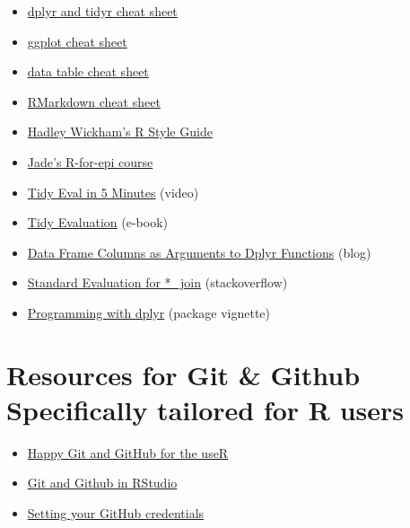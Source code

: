\documentclass[
]{book}
\providecommand{\tightlist}{%
  \setlength{\itemsep}{0pt}\setlength{\parskip}{0pt}}
\begin{document}
\begin{itemize}
\tightlist
\item
  \href{https://www.rstudio.com/wp-content/uploads/2015/02/data-wrangling-cheatsheet.pdf}{dplyr and tidyr cheat sheet}
\item
  \href{https://www.rstudio.com/wp-content/uploads/2015/03/ggplot2-cheatsheet.pdf}{ggplot cheat sheet}
\item
  \href{https://s3.amazonaws.com/assets.datacamp.com/blog_assets/datatable_Cheat_Sheet_R.pdf}{data table cheat sheet}
\item
  \href{https://www.rstudio.com/wp-content/uploads/2015/02/rmarkdown-cheatsheet.pdf}{RMarkdown cheat sheet}
\item
  \href{http://adv-r.had.co.nz/Style.html}{Hadley Wickham's R Style Guide}
\item
  \href{https://ucb-epi-r.github.io}{Jade's R-for-epi course}
\item
  \href{https://www.youtube.com/watch?v=nERXS3ssntw}{Tidy Eval in 5 Minutes} (video)
\item
  \href{https://tidyeval.tidyverse.org/index.html}{Tidy Evaluation} (e-book)
\item
  \href{https://www.brodrigues.co/blog/2016-07-18-data-frame-columns-as-arguments-to-dplyr-functions/}{Data Frame Columns as Arguments to Dplyr Functions} (blog)
\item
  \href{https://stackoverflow.com/questions/28125816/r-standard-evaluation-for-join-dplyr}{Standard Evaluation for *\_join} (stackoverflow)
\item
  \href{https://dplyr.tidyverse.org/articles/programming.html}{Programming with dplyr} (package vignette)
\end{itemize}

\section{Resources for Git \& Github Specifically tailored for R users}\label{resources-for-git-github-specifically-tailored-for-r-users}

\begin{itemize}
\tightlist
\item
  \href{https://happygitwithr.com}{Happy Git and GitHub for the useR}
\item
  \href{https://jcoliver.github.io/learn-r/010-github.html}{Git and Github in RStudio}
\item
  \href{https://gist.github.com/Z3tt/3dab3535007acf108391649766409421}{Setting your GitHub credentials}
\end{itemize}
\end{document}
